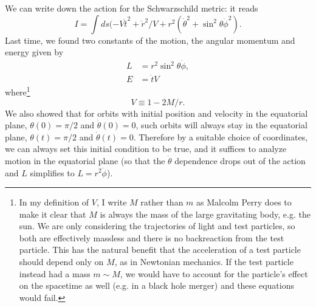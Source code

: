 We can write down the action for the Schwarzschild metric: it reads
$$I=\int ds (-V\dot t^2 +\dot r^2/V + r^2(\dot\theta^2 +\sin^2\theta \dot\phi^2).$$ 
Last time, we found two constants of the motion, the angular momentum and energy given by
\begin{align*}
    L&= r^2\sin^2\theta \dot \phi,\\
    E&= \dot t V
\end{align*}
where\footnote{In my definition of $V$, I write $M$ rather than $m$ as Malcolm Perry does to make it clear that $M$ is always the mass of the large gravitating body, e.g. the sun. We are only considering the trajectories of light and test particles, so both are effectively massless and there is no backreaction from the test particle. This has the natural benefit that the acceleration of a test particle should depend only on $M$, as in Newtonian mechanics. If the test particle instead had a mass $m\sim M$, we would have to account for the particle's effect on the spacetime as well (e.g. in a black hole merger) and these equations would fail.} $$V\equiv 1-2M/r.$$
We also showed that for orbits with initial position and velocity in the equatorial plane, $\theta(0)=\pi/2$ and $\dot \theta(0)=0$, such orbits will always stay in the equatorial plane, $\theta(t)=\pi/2$ and $\dot \theta(t)=0$. Therefore by a suitable choice of coordinates, we can always set this initial condition to be true, and it suffices to analyze motion in the equatorial plane (so that the $\dot \theta$ dependence drops out of the action and $L$ simplifies to $L=r^2 \dot \phi$). 

